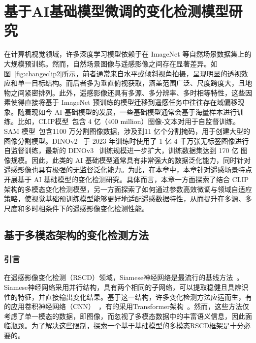   
\chapter{基于AI基础模型微调的变化检测模型研究}

在计算机视觉领域，许多深度学习模型依赖于在 ImageNet 等自然场景数据集上的大规模预训练。然而，自然场景图像与遥感影像之间存在显著差异。如图~\ref{fig:changeclip2}所示，前者通常来自水平或倾斜视角拍摄，呈现明显的透视效应和单一目标结构。而后者多为垂直俯视获取，涵盖范围广泛、尺度跨度大，且地物之间紧密排列。此外，遥感影像还具有多源、多分辨率、多时相等特性，这些因素使得直接将基于 ImageNet 预训练的模型迁移到遥感任务中往往存在域偏移现象。随着现如今 AI 基础模型的发展，一些基础模型通常会基于海量样本进行训练。比如，CLIP模型~\cite{Radford2021LearningTV}包含 4 亿（400 million）图像‑文本对用于自监督训练。SAM 模型~\cite{Kirillov2023SegmentA}包含1100 万分割图像数据，涉及到11 亿个分割掩码，用于创建大型的图像分割模型。DINOv2~\cite{Oquab2023DINOv2LR} 于 2023 年训练时使用了 1 亿 4 千万张无标签图像进行自监督训练，最新的 DINOv3~\cite{simeoni2025dinov3} 训练规模进一步扩大，训练数据集达到 170 亿 图像规模。因此，此类的 AI 基础模型通常具有非常强大的数据泛化能力，同时针对遥感影像也具有极强的无监督泛化能力。为此，在本章中，本章针对遥感场景特点开展基于 AI 基础模型的变化检测研究。具体而言，本章一方面探索了结合 CLIP 架构的多模态变化检测模型，另一方面探索了如何通过参数高效微调与领域自适应策略，使视觉基础预训练模型能够更好地适配遥感数据特性，从而提升在多源、多尺度和多时相条件下的遥感影像变化检测性能。

\section{基于多模态架构的变化检测方法}
\subsection{引言}

在遥感影像变化检测（RSCD）领域，Siamese神经网络是最流行的基线方法~\cite{Koch2015SiameseNN, Wang2022AnES}。Siamese神经网络采用并行结构，具有两个相同的子网络，可以提取稳健且具辨识性的特征，并直接输出变化结果。基于这一结构，许多变化检测方法应运而生，有的应用卷积神经网络（CNN）~\cite{chen2023continuous, Tian2022LargescaleDL, zhu_land-useland-cover_2022-1}，有的采用Transformer架构~\cite{chen_remote_2022, Li2022TransUNetCDAH, Liu2022RemoteSI}。然而，这些方法仅考虑了单一模态的数据，即图像，而忽视了多模态数据中的丰富语义信息，因此面临瓶颈。为了解决这些限制，探索一个基于基础模型的多模态RSCD框架是十分必要的。

